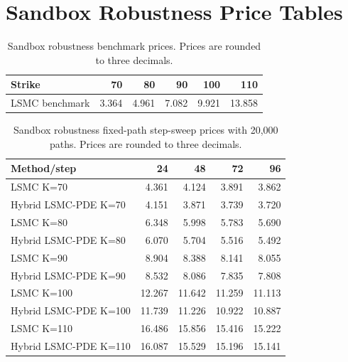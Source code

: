 \section*{Sandbox Robustness Price Tables}
\begin{table}[H]\centering
\caption{Sandbox robustness benchmark prices. Prices are rounded to three decimals.}
\begin{tabular}{lrrrrr}
\toprule
Strike & 70 & 80 & 90 & 100 & 110 \\
\midrule
LSMC benchmark & 3.364 & 4.961 & 7.082 & 9.921 & 13.858 \\
\bottomrule
\end{tabular}
\end{table}

\begin{table}[H]\centering
\caption{Sandbox robustness fixed-path step-sweep prices with 20,000 paths. Prices are rounded to three decimals.}
\begin{tabular}{lrrrr}
\toprule
Method/step & 24 & 48 & 72 & 96 \\
\midrule
LSMC K=70 & 4.361 & 4.124 & 3.891 & 3.862 \\
Hybrid LSMC-PDE K=70 & 4.151 & 3.871 & 3.739 & 3.720 \\
LSMC K=80 & 6.348 & 5.998 & 5.783 & 5.690 \\
Hybrid LSMC-PDE K=80 & 6.070 & 5.704 & 5.516 & 5.492 \\
LSMC K=90 & 8.904 & 8.388 & 8.141 & 8.055 \\
Hybrid LSMC-PDE K=90 & 8.532 & 8.086 & 7.835 & 7.808 \\
LSMC K=100 & 12.267 & 11.642 & 11.259 & 11.113 \\
Hybrid LSMC-PDE K=100 & 11.739 & 11.226 & 10.922 & 10.887 \\
LSMC K=110 & 16.486 & 15.856 & 15.416 & 15.222 \\
Hybrid LSMC-PDE K=110 & 16.087 & 15.529 & 15.196 & 15.141 \\
\bottomrule
\end{tabular}
\end{table}

